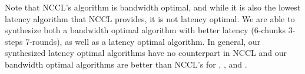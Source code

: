 
Note that NCCL's \allgather algorithm is bandwidth optimal, 
and while it is also the lowest latency algorithm that NCCL provides, it is not latency optimal. We
are able to synthesize both a bandwidth optimal algorithm with better latency
(6-chunks 3-steps 7-rounds), as well as a latency optimal algorithm.
In general, our
synthesized latency optimal algorithms have no counterpart in NCCL
and our bandwidth optimal algorithms are better than NCCL's for \allgather,
\broadcast, and \reduce.


